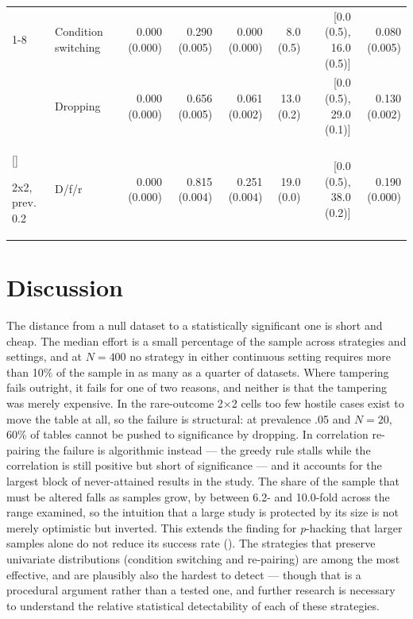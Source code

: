 \documentclass[
  nonatbib,
  authoryear,
  preprint]{elsarticle}
\begin{document}
\begin{landscape}
\begin{longtable}[t]{llrrrrrr}
\cmidrule{1-8}\pagebreak[0]
 & Condition switching & 0.000 (0.000) & 0.290 (0.005) & 0.000 (0.000) & 8.0 (0.5) & {}[0.0 (0.5), 16.0 (0.5)] & 0.080 (0.005)\\
\nopagebreak
 & Dropping & 0.000 (0.000) & 0.656 (0.005) & 0.061 (0.002) & 13.0 (0.2) & {}[0.0 (0.5), 29.0 (0.1)] & 0.130 (0.002)\\
\nopagebreak
\multirow[t]{-2}{*}[\normalbaselineskip]{\raggedright\arraybackslash 2x2, prev. 0.2} & D/f/r & 0.000 (0.000) & 0.815 (0.004) & 0.251 (0.004) & 19.0 (0.0) & {}[0.0 (0.5), 38.0 (0.2)] & 0.190 (0.000)\\
\bottomrule

\end{longtable}

\endgroup{}

\end{landscape}
\clearpage

\section{Discussion}\label{discussion}

The distance from a null dataset to a statistically significant one is
short and cheap. The median effort is a small percentage of the sample
across strategies and settings, and at \(N = 400\) no strategy in either
continuous setting requires more than 10\% of the sample in as many as a
quarter of datasets. Where tampering fails outright, it fails for one of
two reasons, and neither is that the tampering was merely expensive. In
the rare-outcome 2×2 cells too few hostile cases exist to move the table
at all, so the failure is structural: at prevalence .05 and \(N = 20\),
60\% of tables cannot be pushed to significance by dropping. In
correlation re-pairing the failure is algorithmic instead --- the greedy
rule stalls while the correlation is still positive but short of
significance --- and it accounts for the largest block of never-attained
results in the study. The share of the sample that must be altered falls
as samples grow, by between 6.2- and 10.0-fold across the range
examined, so the intuition that a large study is protected by its size
is not merely optimistic but inverted. This extends the finding for
\emph{p}-hacking that larger samples alone do not reduce its success
rate (). The
strategies that preserve univariate distributions (condition switching
and re-pairing) are among the most effective, and are plausibly also the
hardest to detect --- though that is a procedural argument rather than a
tested one, and further research is necessary to understand the relative
statistical detectability of each of these strategies.
\end{document}
